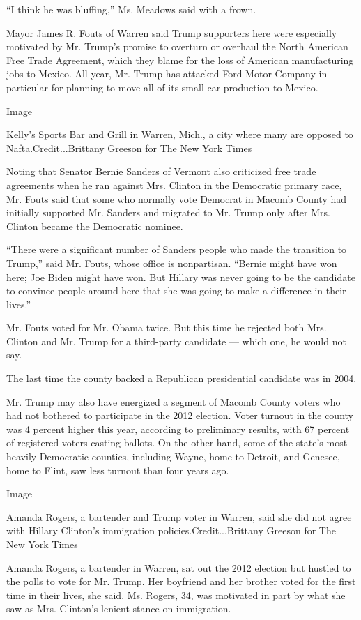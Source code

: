 ``I think he was bluffing,'' Ms. Meadows said with a frown.

Mayor James R. Fouts of Warren said Trump supporters here were
especially motivated by Mr. Trump's promise to overturn or overhaul the
North American Free Trade Agreement, which they blame for the loss of
American manufacturing jobs to Mexico. All year, Mr. Trump has attacked
Ford Motor Company in particular for planning to move all of its small
car production to Mexico.

Image

Kelly's Sports Bar and Grill in Warren, Mich., a city where many are
opposed to Nafta.Credit...Brittany Greeson for The New York Times

Noting that Senator Bernie Sanders of Vermont also criticized free trade
agreements when he ran against Mrs. Clinton in the Democratic primary
race, Mr. Fouts said that some who normally vote Democrat in Macomb
County had initially supported Mr. Sanders and migrated to Mr. Trump
only after Mrs. Clinton became the Democratic nominee.

``There were a significant number of Sanders people who made the
transition to Trump,'' said Mr. Fouts, whose office is nonpartisan.
``Bernie might have won here; Joe Biden might have won. But Hillary was
never going to be the candidate to convince people around here that she
was going to make a difference in their lives.''

Mr. Fouts voted for Mr. Obama twice. But this time he rejected both Mrs.
Clinton and Mr. Trump for a third-party candidate --- which one, he
would not say.

The last time the county backed a Republican presidential candidate was
in 2004.

Mr. Trump may also have energized a segment of Macomb County voters who
had not bothered to participate in the 2012 election. Voter turnout in
the county was 4 percent higher this year, according to preliminary
results, with 67 percent of registered voters casting ballots. On the
other hand, some of the state's most heavily Democratic counties,
including Wayne, home to Detroit, and Genesee, home to Flint, saw less
turnout than four years ago.

Image

Amanda Rogers, a bartender and Trump voter in Warren, said she did not
agree with Hillary Clinton's immigration policies.Credit...Brittany
Greeson for The New York Times

Amanda Rogers, a bartender in Warren, sat out the 2012 election but
hustled to the polls to vote for Mr. Trump. Her boyfriend and her
brother voted for the first time in their lives, she said. Ms. Rogers,
34, was motivated in part by what she saw as Mrs. Clinton's lenient
stance on immigration.

